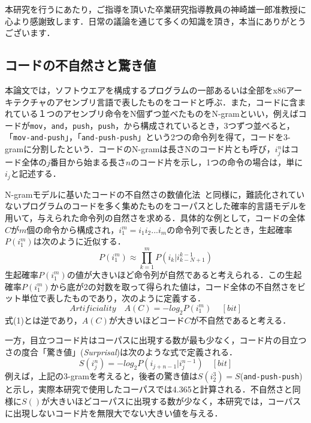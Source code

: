 \documentclass[12pt]{jarticle}
\begin{document}
本研究を行うにあたり，ご指導を頂いた卒業研究指導教員の神崎雄一郎准教授に心より感謝致します．日常の議論を通じて多くの知識を頂き，本当にありがとうございます．


\newpage

\begin{appendices}
\section{コードの不自然さと驚き値}  \label{appendix:artAndsurp}
本論文では，ソフトウエアを構成するプログラムの一部あるいは全部をx86アーキテクチャのアセンブリ言語で表したものをコードと呼ぶ．また，コードに含まれている１つのアセンブリ命令をN個ずつ並べたものをN-gramといい，例えばコードが\texttt{mov}，\texttt{and}，\texttt{push}，\texttt{push}，から構成されているとき，3つずつ並べると，「\texttt{mov-and-push}」，「\texttt{and-push-push}」という2つの命令列を得て，コードを3-gramに分割したという．コードのN-gramは長さNのコード片とも呼び，$i_j^n$はコード全体の$j$番目から始まる長さ$n$のコード片を示し，1つの命令の場合は，単に$i_j$と記述する．

N-gramモデルに基いたコードの不自然さの数値化法~\cite{code-art}と同様に，難読化されていないプログラムのコードを多く集めたものをコーパスとした確率的言語モデルを用いて，与えられた命令列の自然さを求める．具体的な例として，コードの全体$C$が$m$個の命令から構成され，$i_1^m=i_1i_2...i_m$の命令列で表したとき，生起確率$P(i_1^m)$は次のように近似する．
\begin{equation}
  P(i_1^m)\approx\prod_{k=1}^m P(i_k|i_{k-N+1}^{k-1})
\end{equation}
生起確率$P(i_1^m)$の値が大きいほど命令列が自然であると考えられる．この生起確率$P(i_1^m)$から底が2の対数を取って得られた値は，コード全体の不自然さをビット単位で表したものであり，次のように定義する．
\begin{equation}
  Artificiality\quad A(C)=-log_2P(i_1^m)\,\quad[bit]
\end{equation}
式(1)とは逆であり，$A(C)$が大きいほどコード$C$が不自然であると考える．

一方，目立つコード片はコーパスに出現する数が最も少なく，コード片の目立つさの度合「驚き値」(\textit{Surprisal})は次のような式で定義される．
\begin{equation}
  S(i_j^n)=-log_2P(i_{j+n-1}|i_j^{n-1})\quad[bit]
\end{equation}
例えば，上記の3-gramを考えると，後者の驚き値は$S(i_2^3)=S$(\texttt{and-push-push})と示し，実際本研究で使用したコーパスでは4.365と計算される．不自然さと同様に$S()$が大きいほどコーパスに出現する数が少なく，本研究では，コーパスに出現しないコード片を無限大でない大きい値を与える．



\end{appendices}
\end{document}
